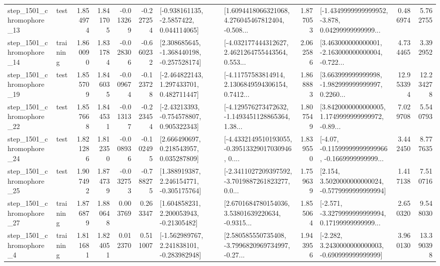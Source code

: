 \begin{tabular}{llrrrrllrlrr}
 step\_1501\_chromophore\_13 &      test &      1.854974 &    1.841705 &     -0.013269 & -0.227254 &     [-0.938161135, -2.5857422, 0.044114065] &  [1.6094418066321068, 4.276045467812404, -0.508... &       1.877053 &  [-1.4349999999999952, -3.878, 0.04299999999999... &            0.486974 &          5.762755 \\
 step\_1501\_chromophore\_14 &  training &      1.860090 &    1.831784 &     -0.028306 & -0.660232 &   [2.308685645, -1.368440198, -0.257528174] &  [-4.032177444312627, 2.4621264755443564, 0.553... &       2.062586 &  [3.463000000000001, -2.163000000000004, -0.722... &            4.734465 &          3.392952 \\
 step\_1501\_chromophore\_19 &      test &      1.855709 &    1.846035 &     -0.009674 & -0.123728 &    [-2.464822143, 1.297433701, 0.482711447] &  [-4.11757583814914, 2.1306849594306154, 0.7412... &       1.868883 &  [3.663999999999998, -1.982999999999997, 0.2260... &           12.953394 &         12.234278 \\
 step\_1501\_chromophore\_22 &      test &      1.857668 &    1.844531 &     -0.013137 & -0.223454 &    [-2.43213393, -0.754578807, 0.905322343] &  [-4.129576273472632, -1.1493451128865364, 1.38... &       1.807549 &  [3.8420000000000005, 1.1749999999999972, -0.89... &            7.029708 &          5.540793 \\
 step\_1501\_chromophore\_24 &      test &      1.821286 &    1.812350 &     -0.008936 & -0.102495 &     [2.666490697, 0.218543957, 0.035287809] &  [-4.4332149510193055, -0.39513329017030946, 0.... &       1.839550 &  [-4.07, -0.11599999999999966, -0.1669999999999... &            3.442450 &          8.777635 \\
 step\_1501\_chromophore\_25 &      test &      1.907492 &    1.874739 &     -0.032753 & -0.788275 &    [1.388919387, 2.246154771, -0.305175764] &  [-2.3411027209397592, -3.7019887261823277, 0.0... &       1.759639 &   [2.154, 3.5020000000000024, -0.5779999999999994] &            1.417138 &          7.510716 \\
 step\_1501\_chromophore\_27 &  training &      1.876879 &    1.880648 &      0.003769 &  0.263347 &     [1.604858231, 2.200053943, -0.21305482] &  [2.6701684780154036, 3.53801639220634, -0.9315... &       1.855064 &  [-2.571, -3.3279999999999994, 0.17199999999999... &            2.650320 &          9.548030 \\
  step\_1501\_chromophore\_4 &  training &      1.811681 &    1.824051 &      0.012370 &  0.511007 &   [-1.562989767, 2.241838101, -0.283982948] &  [2.580585550735408, -3.7996820969734997, -0.27... &       1.943956 &   [-2.282, 3.2430000000000003, -0.690999999999999] &            3.960130 &         13.390398 \\

\end{tabular}
